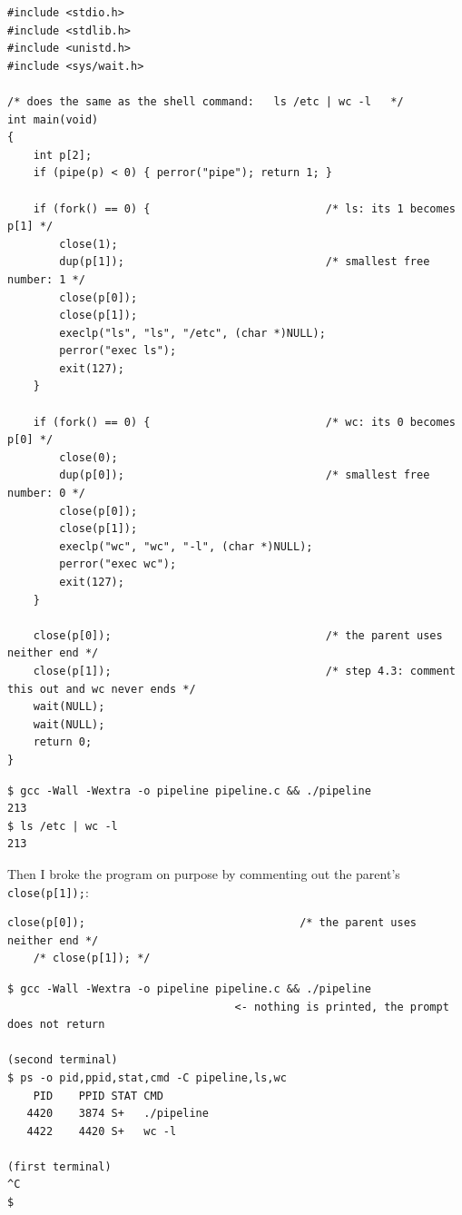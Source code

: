 \documentclass[12pt,a4paper]{article}
\begin{document}
\begin{lstlisting}[style=code,caption={pipeline.c}]
#include <stdio.h>
#include <stdlib.h>
#include <unistd.h>
#include <sys/wait.h>

/* does the same as the shell command:   ls /etc | wc -l   */
int main(void)
{
    int p[2];
    if (pipe(p) < 0) { perror("pipe"); return 1; }

    if (fork() == 0) {                           /* ls: its 1 becomes p[1] */
        close(1);
        dup(p[1]);                               /* smallest free number: 1 */
        close(p[0]);
        close(p[1]);
        execlp("ls", "ls", "/etc", (char *)NULL);
        perror("exec ls");
        exit(127);
    }

    if (fork() == 0) {                           /* wc: its 0 becomes p[0] */
        close(0);
        dup(p[0]);                               /* smallest free number: 0 */
        close(p[0]);
        close(p[1]);
        execlp("wc", "wc", "-l", (char *)NULL);
        perror("exec wc");
        exit(127);
    }

    close(p[0]);                                 /* the parent uses neither end */
    close(p[1]);                                 /* step 4.3: comment this out and wc never ends */
    wait(NULL);
    wait(NULL);
    return 0;
}
\end{lstlisting}

\begin{lstlisting}[style=terminal,caption={Comparing pipeline with the real shell}]
$ gcc -Wall -Wextra -o pipeline pipeline.c && ./pipeline
213
$ ls /etc | wc -l
213
\end{lstlisting}

Then I broke the program on purpose by commenting out the parent's \texttt{close(p[1]);}:

\begin{lstlisting}[style=code,caption={The change of step 4.3},numbers=none]
    close(p[0]);                                 /* the parent uses neither end */
    /* close(p[1]); */
\end{lstlisting}

\begin{lstlisting}[style=terminal,caption={The broken pipeline hangs; ps from a second terminal}]
$ gcc -Wall -Wextra -o pipeline pipeline.c && ./pipeline
                                   <- nothing is printed, the prompt does not return

(second terminal)
$ ps -o pid,ppid,stat,cmd -C pipeline,ls,wc
    PID    PPID STAT CMD
   4420    3874 S+   ./pipeline
   4422    4420 S+   wc -l

(first terminal)
^C
$
\end{lstlisting}
\end{document}
